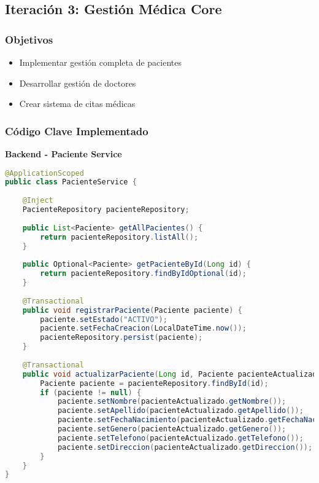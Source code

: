 \documentclass[12pt,a4paper]{article}
\begin{document}
\subsection{Iteración 3: Gestión Médica Core}

\subsubsection{Objetivos}
\begin{itemize}
    \item Implementar gestión completa de pacientes
    \item Desarrollar gestión de doctores
    \item Crear sistema de citas médicas
\end{itemize}

\subsubsection{Código Clave Implementado}

\textbf{Backend - Paciente Service}
\begin{lstlisting}[language=java]
@ApplicationScoped
public class PacienteService {
    
    @Inject
    PacienteRepository pacienteRepository;
    
    public List<Paciente> getAllPacientes() {
        return pacienteRepository.listAll();
    }
    
    public Optional<Paciente> getPacienteById(Long id) {
        return pacienteRepository.findByIdOptional(id);
    }
    
    @Transactional
    public void registrarPaciente(Paciente paciente) {
        paciente.setEstado("ACTIVO");
        paciente.setFechaCreacion(LocalDateTime.now());
        pacienteRepository.persist(paciente);
    }
    
    @Transactional
    public void actualizarPaciente(Long id, Paciente pacienteActualizado) {
        Paciente paciente = pacienteRepository.findById(id);
        if (paciente != null) {
            paciente.setNombre(pacienteActualizado.getNombre());
            paciente.setApellido(pacienteActualizado.getApellido());
            paciente.setFechaNacimiento(pacienteActualizado.getFechaNacimiento());
            paciente.setGenero(pacienteActualizado.getGenero());
            paciente.setTelefono(pacienteActualizado.getTelefono());
            paciente.setDireccion(pacienteActualizado.getDireccion());
        }
    }
}
\end{lstlisting}
\end{document}
